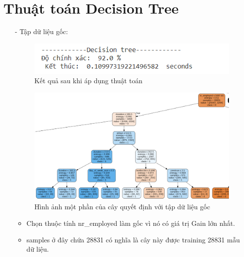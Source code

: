 \documentclass{report}
\begin{document}
\section{Thuật toán Decision Tree}
     \fontsize{13}{14}\selectfont
     \begin{enumerate}
    \item [- ]	Tập dữ liệu gốc:
         \begin{center}
        \begin{figure}[htp]
    	\begin{center}
    		\includegraphics[scale =1]{images/dt_o.PNG}
    	\end{center}
    		\caption{Kết quả sau khi áp dụng thuật toán}
    \end{figure}
        \end{center} 
         \begin{center}
        \begin{figure}[htp]
    	\begin{center}
    		\includegraphics[scale =0.5]{images/tree_gra_o.PNG}
    	\end{center}
    		\caption{Hình ảnh một phần của cây quyết định với tập dữ liệu gốc}
    \end{figure}
        \end{center}
        \begin{itemize}
            \item Chọn thuộc tính nr\_employed làm gốc vì nó có giá trị Gain lớn nhất.
            \item samples ở đây chứa 28831 có nghĩa là cây này được training 28831 mẫu dữ liệu.

\end{itemize}
\end{enumerate}
\end{document}
